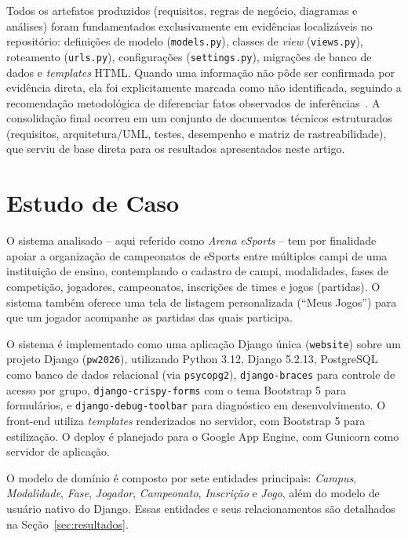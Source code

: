 \documentclass[12pt]{article}
\begin{document}
Todos os artefatos produzidos (requisitos, regras de negócio, diagramas e
análises) foram fundamentados exclusivamente em evidências localizáveis no
repositório: definições de modelo (\texttt{models.py}), classes de
\emph{view} (\texttt{views.py}), roteamento (\texttt{urls.py}),
configurações (\texttt{settings.py}), migrações de banco de dados e
\emph{templates} HTML. Quando uma informação não pôde ser confirmada por
evidência direta, ela foi explicitamente marcada como não identificada,
seguindo a recomendação metodológica de diferenciar fatos observados de
inferências~\cite{chikofsky1990}. A consolidação final ocorreu em um conjunto
de documentos técnicos estruturados (requisitos, arquitetura/UML, testes,
desempenho e matriz de rastreabilidade), que serviu de base direta para os
resultados apresentados neste artigo.

\section{Estudo de Caso}
\label{sec:estudo}

O sistema analisado -- aqui referido como \emph{Arena eSports} -- tem por
finalidade apoiar a organização de campeonatos de eSports entre múltiplos
campi de uma instituição de ensino, contemplando o cadastro de campi,
modalidades, fases de competição, jogadores, campeonatos, inscrições de
times e jogos (partidas). O sistema também oferece uma tela de listagem
personalizada (``Meus Jogos'') para que um jogador acompanhe as partidas das
quais participa.

O sistema é implementado como uma aplicação Django única (\texttt{website})
sobre um projeto Django (\texttt{pw2026}), utilizando Python 3.12, Django
5.2.13, PostgreSQL como banco de dados relacional (via \texttt{psycopg2}),
\texttt{django-braces} para controle de acesso por grupo,
\texttt{django-crispy-forms} com o tema Bootstrap 5 para formulários, e
\texttt{django-debug-toolbar} para diagnóstico em desenvolvimento. O
front-end utiliza \emph{templates} renderizados no servidor, com Bootstrap 5
para estilização. O deploy é planejado para o Google App Engine, com
Gunicorn como servidor de aplicação.

O modelo de domínio é composto por sete entidades principais: \emph{Campus},
\emph{Modalidade}, \emph{Fase}, \emph{Jogador}, \emph{Campeonato},
\emph{Inscrição} e \emph{Jogo}, além do modelo de usuário nativo do Django.
Essas entidades e seus relacionamentos são detalhados na
Seção~\ref{sec:resultados}.
\end{document}
